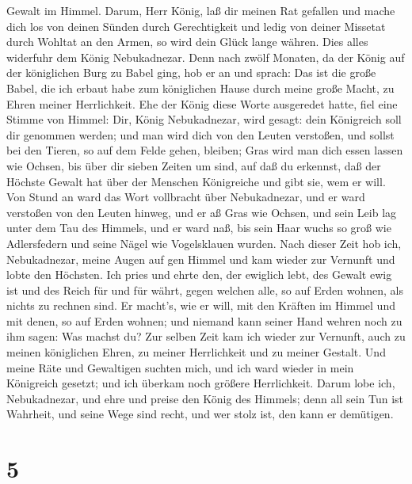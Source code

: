 Gewalt im Himmel.  Darum, Herr König, laß dir meinen Rat
gefallen und mache dich los von deinen Sünden durch Gerechtigkeit und
ledig von deiner Missetat durch Wohltat an den Armen, so wird dein Glück
lange währen.  Dies alles widerfuhr dem König Nebukadnezar.
 Denn nach zwölf Monaten, da der König auf der königlichen
Burg zu Babel ging,  hob er an und sprach: Das ist die
große Babel, die ich erbaut habe zum königlichen Hause durch meine große
Macht, zu Ehren meiner Herrlichkeit.  Ehe der König diese
Worte ausgeredet hatte, fiel eine Stimme von Himmel: Dir, König
Nebukadnezar, wird gesagt: dein Königreich soll dir genommen werden;
 und man wird dich von den Leuten verstoßen, und sollst bei
den Tieren, so auf dem Felde gehen, bleiben; Gras wird man dich essen
lassen wie Ochsen, bis über dir sieben Zeiten um sind, auf daß du
erkennst, daß der Höchste Gewalt hat über der Menschen Königreiche und
gibt sie, wem er will.  Von Stund an ward das Wort
vollbracht über Nebukadnezar, und er ward verstoßen von den Leuten
hinweg, und er aß Gras wie Ochsen, und sein Leib lag unter dem Tau des
Himmels, und er ward naß, bis sein Haar wuchs so groß wie Adlersfedern
und seine Nägel wie Vogelsklauen wurden.  Nach dieser Zeit
hob ich, Nebukadnezar, meine Augen auf gen Himmel und kam wieder zur
Vernunft und lobte den Höchsten. Ich pries und ehrte den, der ewiglich
lebt, des Gewalt ewig ist und des Reich für und für währt, 
gegen welchen alle, so auf Erden wohnen, als nichts zu rechnen sind. Er
macht's, wie er will, mit den Kräften im Himmel und mit denen, so auf
Erden wohnen; und niemand kann seiner Hand wehren noch zu ihm sagen: Was
machst du?  Zur selben Zeit kam ich wieder zur Vernunft,
auch zu meinen königlichen Ehren, zu meiner Herrlichkeit und zu meiner
Gestalt. Und meine Räte und Gewaltigen suchten mich, und ich ward wieder
in mein Königreich gesetzt; und ich überkam noch größere Herrlichkeit.
 Darum lobe ich, Nebukadnezar, und ehre und preise den
König des Himmels; denn all sein Tun ist Wahrheit, und seine Wege sind
recht, und wer stolz ist, den kann er demütigen.

\hypertarget{section-4}{%
\section{5}\label{section-4}}

